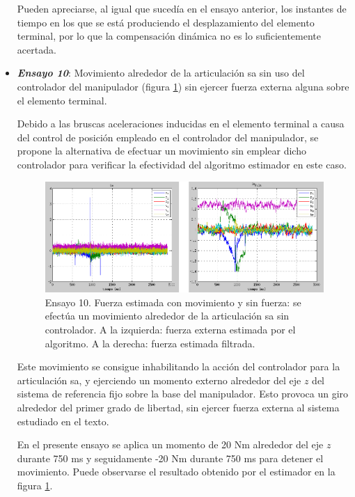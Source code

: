 \begin{itemize}
Pueden apreciarse, al igual que sucedía en el ensayo anterior, los instantes de tiempo en los que se está produciendo el desplazamiento del elemento terminal, por lo que la compensación dinámica no es lo suficientemente acertada. \par 

\item \textbf{\emph{Ensayo 10}}: Movimiento alrededor de la articulación \acrshort{sa} sin uso del controlador del manipulador (figura \ref{fig:cmsf-SAsc}) sin ejercer fuerza externa alguna sobre el elemento terminal.

Debido a las bruscas aceleraciones inducidas en el elemento terminal a causa del control de posición empleado en el controlador del manipulador, se propone la alternativa de efectuar un movimiento sin emplear dicho controlador para verificar la efectividad del algoritmo estimador en este caso. \par 

\begin{figure}[h!]
\centering
\includegraphics[scale=0.4]{Figuras/cmsf-SAsc}
\caption[Ensayo 10. Fuerza estimada con movimiento y sin fuerza]{Ensayo 10. Fuerza estimada con movimiento y sin fuerza: se efectúa un movimiento alrededor de la articulación \acrshort{sa} sin controlador. A la izquierda: fuerza externa estimada por el algoritmo. A la derecha: fuerza estimada filtrada.}
\label{fig:cmsf-SAsc}
\end{figure}

Este movimiento se consigue inhabilitando la acción del controlador para la articulación \acrshort{sa}, y ejerciendo un momento externo alrededor del eje $z$ del sistema de referencia fijo sobre la base del manipulador. Esto provoca un giro alrededor del primer grado de libertad, sin ejercer fuerza externa al sistema estudiado en el texto. \par 

En el presente ensayo se aplica un momento de 20 Nm alrededor del eje $z$ durante 750 ms y seguidamente -20 Nm durante 750 ms para detener el movimiento. Puede observarse el resultado obtenido por el estimador en la figura \ref{fig:cmsf-SAsc}. \par 


\end{itemize}
